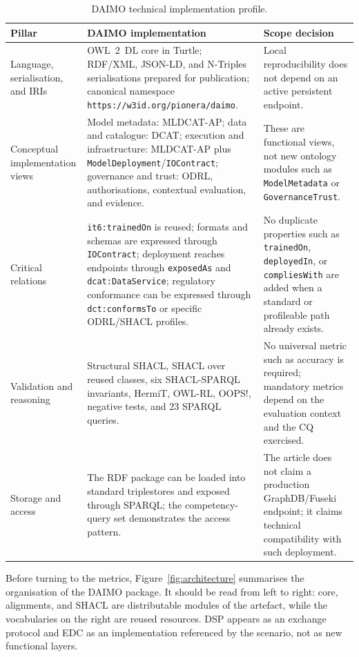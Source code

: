 \documentclass[Afour,sagev,times]{sagej}
\newcommand{\code}[1]{\texttt{#1}}
\begin{document}
\begin{table}[tb]
\scriptsize\sf\centering
\caption{DAIMO technical implementation profile.\label{tab:implementation-profile}}
\begin{tabular}{@{}p{3.0cm}p{7.0cm}p{4.8cm}@{}}
\toprule
\textbf{Pillar} & \textbf{DAIMO implementation} & \textbf{Scope decision} \\
\midrule
Language, serialisation, and IRIs & OWL~2~DL core in Turtle; RDF/XML, JSON-LD, and N-Triples serialisations prepared for publication; canonical namespace \code{https://w3id.org/pionera/daimo}. & Local reproducibility does not depend on an active persistent endpoint. \\
Conceptual implementation views & Model metadata: MLDCAT-AP; data and catalogue: DCAT; execution and infrastructure: MLDCAT-AP plus \code{ModelDeployment}/\code{IOContract}; governance and trust: ODRL, authorisations, contextual evaluation, and evidence. & These are functional views, not new ontology modules such as \code{ModelMetadata} or \code{GovernanceTrust}. \\
Critical relations & \code{it6:trainedOn} is reused; formats and schemas are expressed through \code{IOContract}; deployment reaches endpoints through \code{exposedAs} and \code{dcat:DataService}; regulatory conformance can be expressed through \code{dct:conformsTo} or specific ODRL/SHACL profiles. & No duplicate properties such as \code{trainedOn}, \code{deployedIn}, or \code{compliesWith} are added when a standard or profileable path already exists. \\
Validation and reasoning & Structural SHACL, SHACL over reused classes, six SHACL-SPARQL invariants, HermiT, OWL-RL, OOPS!, negative tests, and 23 SPARQL queries. & No universal metric such as accuracy is required; mandatory metrics depend on the evaluation context and the CQ exercised. \\
Storage and access & The RDF package can be loaded into standard triplestores and exposed through SPARQL; the competency-query set demonstrates the access pattern. & The article does not claim a production GraphDB/Fuseki endpoint; it claims technical compatibility with such deployment. \\
\bottomrule
\end{tabular}
\end{table}

Before turning to the metrics, Figure~\ref{fig:architecture} summarises the organisation of the DAIMO package. It should be read from left to right: core, alignments, and SHACL are distributable modules of the artefact, while the vocabularies on the right are reused resources. DSP appears as an exchange protocol and EDC as an implementation referenced by the scenario, not as new functional layers.
\end{document}
